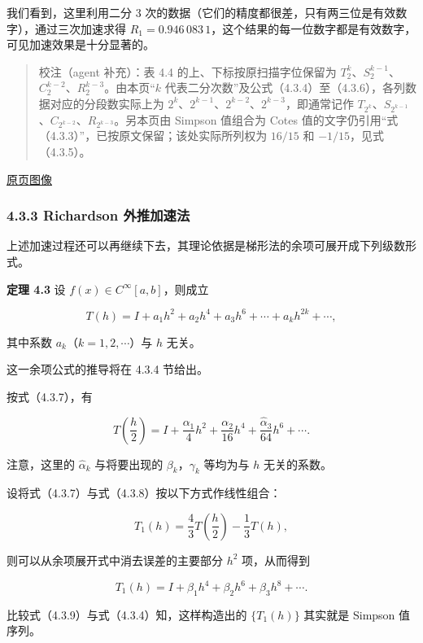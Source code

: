 \documentclass[
  10pt,
  fontset=fandol]{ctexart}
\begin{document}
我们看到，这里利用二分 3 次的数据（它们的精度都很差，只有两三位是有效数字），通过三次加速求得 \(R_1=0.946\,083\,1\)，这个结果的每一位数字都是有效数字，可见加速效果是十分显著的。

\begin{quote}
校注（agent 补充）：表 4.4 的上、下标按原扫描字位保留为 \(T_2^k\)、\(S_2^{k-1}\)、\(C_2^{k-2}\)、\(R_2^{k-3}\)。由本页``\(k\) 代表二分次数''及公式（4.3.4）至（4.3.6），各列数据对应的分段数实际上为 \(2^k\)、\(2^{k-1}\)、\(2^{k-2}\)、\(2^{k-3}\)，即通常记作 \(T_{2^k}\)、\(S_{2^{k-1}}\)、\(C_{2^{k-2}}\)、\(R_{2^{k-3}}\)。另本页由 Simpson 值组合为 Cotes 值的文字仍引用``式（4.3.3）''，已按原文保留；该处实际所列权为 \(16/15\) 和 \(-1/15\)，见式（4.3.5）。
\end{quote}

\href{../../source-images/pdf-104.jpeg}{原页图像}

\subsubsection{4.3.3 Richardson 外推加速法}\label{richardson-ux5916ux63a8ux52a0ux901fux6cd5}

上述加速过程还可以再继续下去，其理论依据是梯形法的余项可展开成下列级数形式。

\textbf{定理 4.3} 设 \(f(x)\in C^\infty[a,b]\)，则成立

\[
T(h)=I+a_1h^2+a_2h^4+a_3h^6+\cdots+a_kh^{2k}+\cdots,
\tag{4.3.7}
\]

其中系数 \(a_k\)（\(k=1,2,\cdots\)）与 \(h\) 无关。

这一余项公式的推导将在 4.3.4 节给出。

按式（4.3.7），有

\[
T\left(\frac h2\right)=I+\frac{\alpha_1}{4}h^2+\frac{\alpha_2}{16}h^4+\frac{\hat\alpha_3}{64}h^6+\cdots.
\tag{4.3.8}
\]

注意，这里的 \(\hat\alpha_k\) 与将要出现的 \(\beta_k\)，\(\gamma_k\) 等均为与 \(h\) 无关的系数。

设将式（4.3.7）与式（4.3.8）按以下方式作线性组合：

\[
T_1(h)=\frac43T\left(\frac h2\right)-\frac13T(h),
\tag{4.3.9}
\]

则可以从余项展开式中消去误差的主要部分 \(h^2\) 项，从而得到

\[
T_1(h)=I+\beta_1h^4+\beta_2h^6+\beta_3h^8+\cdots.
\tag{4.3.10}
\]

比较式（4.3.9）与式（4.3.4）知，这样构造出的 \(\{T_1(h)\}\) 其实就是 Simpson 值序列。
\end{document}
